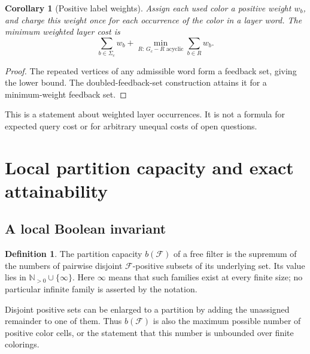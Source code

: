 \documentclass[11pt,letterpaper]{article}
\numberwithin{equation}{section}
\newtheorem{corollary}[corollary]{Corollary}
\theoremstyle{definition}
\newtheorem{definition}[definition]{Definition}
\theoremstyle{remark}
\theoremstyle{definition}
\newcommand{\N}{\mathbb N}
\newcommand{\F}{\mathcal F}
\begin{document}
\begin{corollary}[Positive label weights]\label{fp:cor:weights}
Assign each used color a positive weight \(w_b\), and charge this weight
once for each occurrence of the color in a layer word. The minimum weighted
layer cost is
\[
 \sum_{b\in\Sigma_c}w_b+
 \min_{R:\,G_c-R\text{ acyclic}}\sum_{b\in R}w_b.
\]
\end{corollary}
\begin{proof}
The repeated vertices of any admissible word form a feedback set, giving
the lower bound. The doubled-feedback-set construction attains it for a
minimum-weight feedback set.
\end{proof}
This is a statement about weighted layer occurrences. It is not a formula
for expected query cost or for arbitrary unequal costs of open questions.

\section{Local partition capacity and exact attainability}
\label{fp:sec:capacity}

\subsection{A local Boolean invariant}

\begin{definition}
The partition capacity \(b(\F)\) of a free filter is the supremum of the
numbers of pairwise disjoint \(\F\)-positive subsets of its underlying
set. Its value lies in \(\N_{>0}\cup\{\infty\}\). Here \(\infty\)
means that such families exist at every finite size; no particular infinite
family is asserted by the notation.
\end{definition}

Disjoint positive sets can be enlarged to a partition by adding the
unassigned remainder to one of them. Thus \(b(\F)\) is also the maximum
possible number of positive color cells, or the statement that this number
is unbounded over finite colorings.
\end{document}
